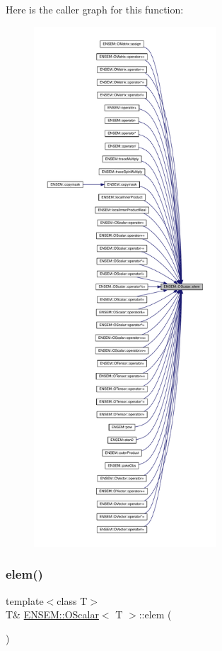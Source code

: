 Here is the caller graph for this function\+:\nopagebreak
\begin{figure}[H]
\begin{center}
\leavevmode
\includegraphics[height=550pt]{da/d80/classENSEM_1_1OScalar_af07cc94eb09bfc29991d8fdc30727574_icgraph}
\end{center}
\end{figure}
\mbox{\label{classENSEM_1_1OScalar_af07cc94eb09bfc29991d8fdc30727574}} 
\subsubsection{\texorpdfstring{elem()}{elem()}\hspace{0.1cm}{\footnotesize\ttfamily [2/4]}}
{\footnotesize\ttfamily template$<$class T$>$ \\
T\& \mbox{\hyperlink{classENSEM_1_1OScalar}{E\+N\+S\+E\+M\+::\+O\+Scalar}}$<$ T $>$\+::elem (\begin{DoxyParamCaption}{ }\end{DoxyParamCaption})\hspace{0.3cm}{\ttfamily [inline]}}

